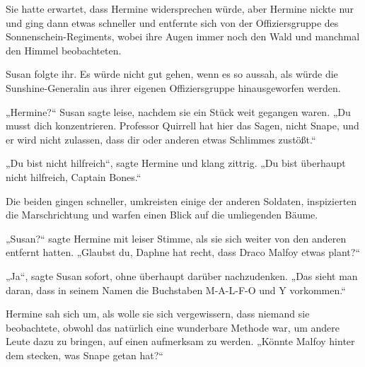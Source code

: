 Sie hatte erwartet, dass Hermine widersprechen würde, aber Hermine nickte nur und ging dann etwas schneller und entfernte sich von der Offiziersgruppe des Sonnenschein-Regiments, wobei ihre Augen immer noch den Wald und manchmal den Himmel beobachteten.

Susan folgte ihr. Es würde nicht gut gehen, wenn es so aussah, als würde die Sunshine-Generalin aus ihrer eigenen Offiziersgruppe hinausgeworfen werden.

„Hermine?“ Susan sagte leise, nachdem sie ein Stück weit gegangen waren.
„Du musst dich konzentrieren. Professor Quirrell hat hier das Sagen, nicht Snape, und er wird nicht zulassen, dass dir oder anderen etwas Schlimmes zustößt.“

„Du bist nicht hilfreich“, sagte Hermine und klang zittrig.
„Du bist überhaupt nicht hilfreich, Captain Bones.“

Die beiden gingen schneller, umkreisten einige der anderen Soldaten, inspizierten die Marschrichtung und warfen einen Blick auf die umliegenden Bäume.

„Susan?“ sagte Hermine mit leiser Stimme, als sie sich weiter von den anderen entfernt hatten.
„Glaubst du, Daphne hat recht, dass Draco Malfoy etwas plant?“

„Ja“, sagte Susan sofort, ohne überhaupt darüber nachzudenken.
„Das sieht man daran, dass in seinem Namen die Buchstaben M-A-L-F-O und Y vorkommen.“

Hermine sah sich um, als wolle sie sich vergewissern, dass niemand sie beobachtete, obwohl das natürlich eine wunderbare Methode war, um andere Leute dazu zu bringen, auf einen aufmerksam zu werden.
„Könnte Malfoy hinter dem stecken, was Snape getan hat?“

